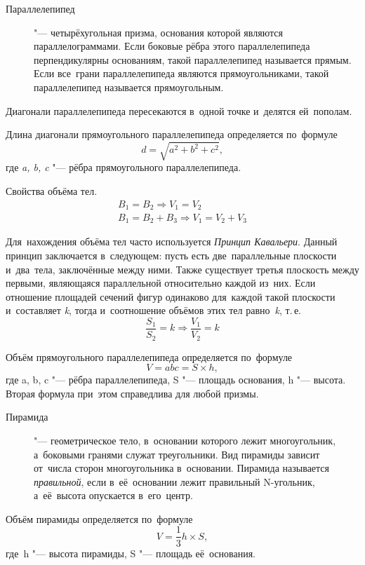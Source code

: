 \documentclass[]{scrartcl}
\begin{document}
\begin{description}
	\item[Параллелепипед] "--- четырёхугольная призма, основания которой являются параллелограммами. Если боковые рёбра этого параллелепипеда перпендикулярны основаниям, такой параллелепипед называется прямым. Если все~грани параллелепипеда являются прямоугольниками, такой параллелепипед называется прямоугольным. 
\end{description}

\begin{proposition}
	Диагонали параллелепипеда пересекаются в~одной точке и~делятся ей~пополам.
\end{proposition}
Длина диагонали прямоугольного параллелепипеда определяется по~формуле
\begin{equation}\label{eq:parallelepiped-diag-lenght}
d=\sqrt{a^2 + b^2 + c^2},
\end{equation}
где \textit{a, b, c} "--- рёбра прямоугольного параллелепипеда.

Свойства объёма тел.
\begin{equation}\label{eq:volume-properties-1}
	\begin{aligned}
	B_{1} = B_{2} \Rightarrow V_{1}=V_{2}\\
	B_{1}=B_{2}+B_{3} \Rightarrow V_{1}=V_{2}+V_{3}
	\end{aligned}
\end{equation}

Для~нахождения объёма тел часто используется \emph{Принцип Кавальери}. Данный принцип заключается в~следующем: пусть есть две~параллельные плоскости и~два~тела, заключённые между ними. Также существует третья плоскость между первыми, являющаяся параллельной относительно каждой из~них. Если отношение площадей сечений фигур одинаково для~каждой такой плоскости и~составляет \textit{k}, тогда и~соотношение объёмов этих тел равно~\textit{k}, т.\,е.
\begin{equation}\label{eq:volume-properties-2}
\frac{S_{1}}{S_{2}}=k \Rightarrow \frac{V_{1}}{V_{2}} = k
\end{equation}

Объём прямоугольного параллелепипеда определяется по~формуле
\begin{equation}\label{eq:parallelepiped-volume-1}
V=abc = S\times h,
\end{equation}
где a, b, c "--- рёбра параллелепипеда, S "--- площадь основания, h "--- высота. Вторая формула при~этом справедлива для любой призмы.

\begin{description}
	\item[Пирамида] "--- геометрическое тело, в~основании которого лежит многоугольник, а~боковыми гранями служат треугольники. Вид пирамиды зависит от~числа сторон многоугольника в~основании. Пирамида называется \emph{правильной}, если в~её~основании лежит правильный N-угольник, а~её~высота опускается в~его~центр.
\end{description}
Объём пирамиды определяется по~формуле
\begin{equation}\label{eq:pyramid-volume}
V=\frac{1}{3}h \times S,
\end{equation}
где~h "--- высота пирамиды, S "--- площадь её~основания.
\end{document}
